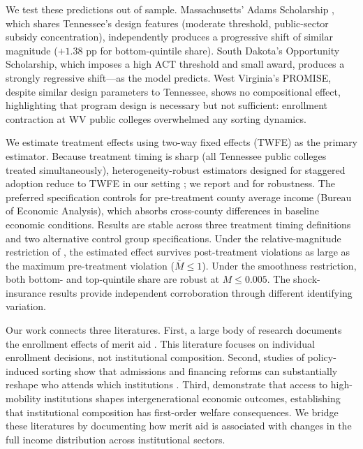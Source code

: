 We test these predictions out of sample. Massachusetts' Adams
Scholarship \parencite{cohodes2014merit}, which shares Tennessee's
design features (moderate threshold, public-sector subsidy
concentration), independently produces a progressive shift of similar
magnitude ($+1.38$ pp for bottom-quintile share). South Dakota's
Opportunity Scholarship, which imposes a high ACT threshold and small
award, produces a strongly regressive shift---as the model predicts.
West Virginia's PROMISE, despite similar design parameters to
Tennessee, shows no compositional effect, highlighting that program
design is necessary but not sufficient: enrollment contraction at WV
public colleges overwhelmed any sorting dynamics.

We estimate treatment effects using two-way fixed effects (TWFE) as the primary estimator.
Because treatment timing is sharp (all Tennessee public colleges
treated simultaneously), heterogeneity-robust estimators designed for
staggered adoption reduce to TWFE in our setting
\parencite{roth2026interpreting}; we report
\textcite{sun2021estimating} and \textcite{dechaisemartin2020two} for
robustness. The preferred
specification controls for pre-treatment county average income (Bureau of Economic Analysis),
which absorbs cross-county differences in baseline economic conditions. Results are stable across
three treatment timing definitions and two alternative control group
specifications. Under the relative-magnitude restriction of
\textcite{rambachan2023more}, the estimated effect survives
post-treatment violations as large as the maximum pre-treatment
violation ($\bar{M} \leq 1$). Under the smoothness restriction, both
bottom- and top-quintile share are robust at $M \leq 0.005$. The
shock-insurance results provide independent corroboration through
different identifying variation.

Our work connects three literatures. First, a large body of research
documents the enrollment effects of merit aid
\parencite{dynarski2000hope, dynarski2004merit, bruce2014jackpot,
cohodes2014merit, song2024hope, cummings2022race,
verzyl2023institutional}. This literature
focuses on individual enrollment decisions, not institutional
composition. Second, studies of policy-induced sorting show that
admissions and financing reforms can substantially reshape who attends
which institutions \parencite{bleemer2022affirmative,
card2005affirmative, hinrichs2012affirmative}. Third,
\textcite{chetty2020mobility} demonstrate that access to
high-mobility institutions shapes intergenerational economic outcomes,
establishing that institutional composition has first-order welfare
consequences. We bridge these literatures by documenting how merit aid is
associated with changes in the full income distribution across
institutional sectors.

